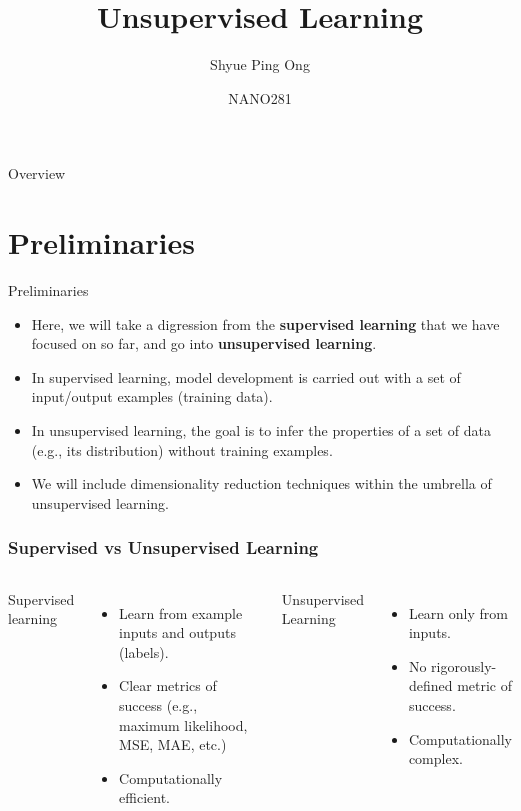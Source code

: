 \documentclass[aspectratio=169]{beamer}
\title[Unsupervised Learning]{Unsupervised Learning}
\author{Shyue Ping Ong}
\institute[UCSD]{University of California, San Diego\\
\medskip
}
\date{NANO281} %
\begin{document}
\begin{frame}
    \titlepage %
\end{frame}


\begin{frame}{Overview}
    \tableofcontents
\end{frame}


\section{Preliminaries}

\begin{frame}{Preliminaries}
    \begin{itemize}
        \item Here, we will take a digression from the \textbf{supervised learning} that we have focused on so far, and go into \textbf{unsupervised learning}.
        \item In supervised learning, model development is carried out with a set of input/output examples (training data). 
        \item In unsupervised learning, the goal is to infer the properties of a set of data (e.g., its distribution) without training examples.
        \item We will include dimensionality reduction techniques within the umbrella of unsupervised learning.
    \end{itemize}
\end{frame}

\begin{frame}
\frametitle{Supervised vs Unsupervised Learning}
\begin{columns}
Supervised learning
\begin{itemize}
    \item Learn from example inputs and outputs (labels).
    \item Clear metrics of success (e.g., maximum likelihood, MSE, MAE, etc.)
    \item Computationally efficient.
\end{itemize}
Unsupervised Learning
\begin{itemize}
    \item Learn only from inputs.
    \item No rigorously-defined metric of success.
    \item Computationally complex.
\end{itemize}

\end{columns}
\end{frame} 
\end{document}

